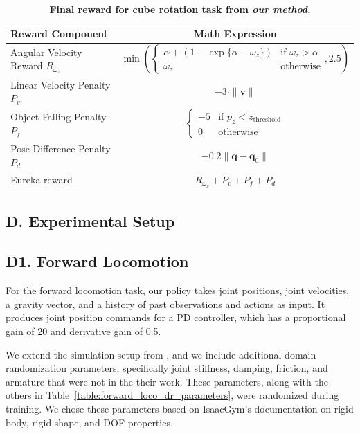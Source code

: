 \documentclass[conference]{IEEEtran}
\begin{document}
\begin{table}[H]
\centering
\begin{tabular}{l|c}
\toprule
    Reward Component & Math Expression \\
\midrule
Angular Velocity Reward $R_{\omega_z}$ & 
$\min \left( 
\begin{cases}
\alpha + (1 - \exp\{\alpha - \omega_z\}) & \text{if } \omega_z > \alpha \\
\omega_z & \text{otherwise}
\end{cases}, 2.5 \right)$ \\
Linear Velocity Penalty $P_v$ & $-3 \cdot \|\mathbf{v}\|$ \\
Object Falling Penalty $P_f$ & 
$\begin{cases} 
-5 & \text{if } p_z < z_{\text{threshold}} \\ 
0 & \text{otherwise} 
\end{cases}$ \\
Pose Difference Penalty $P_d$ & $-0.2 \|\mathbf{q} - \mathbf{q}_0\|$ \\
Eureka reward & $R_{\omega_z} + P_v + P_f + P_d$ \\
\bottomrule
\end{tabular}
\caption{\textbf{Final reward for cube rotation task from \textit{our method}.}}
\label{table:cube_rot_reward_dreureka}
\end{table}


\subsection*{D. Experimental Setup}
\label{appendix:experiment-setup}

\subsection*{D1. Forward Locomotion}
For the forward locomotion task, our policy takes joint positions, joint velocities, a gravity vector, and a history of past observations and actions as input. It produces joint position commands for a PD controller, which has a proportional gain of 20 and derivative gain of 0.5.

We extend the simulation setup from \citet{margolis2022rapid}, and we include additional domain randomization parameters, specifically joint stiffness, damping, friction, and armature that were not in the their work. These parameters, along with the others in Table~\ref{table:forward_loco_dr_parameters}, were randomized during training. We chose these parameters based on IsaacGym's documentation on rigid body, rigid shape, and DOF properties\footnotemark[2].
\end{document}
